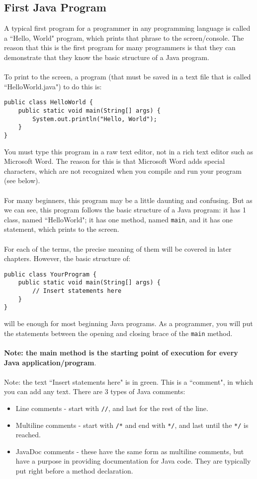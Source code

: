 \subsection{First Java Program}
A typical first program for a programmer in any programming language is called a ``Hello, World" program, which prints that phrase to the screen/console. The reason that this is the first program for many programmers is that they can demonstrate that they know the basic structure of a Java program. 
\\ \\
To print to the screen, a program (that must be saved in a text file that is called ``HelloWorld.java") to do this is:
\begin{lstlisting}
public class HelloWorld {
	public static void main(String[] args) {
		System.out.println("Hello, World");
	}
}
\end{lstlisting}
You must type this program in a raw text editor, not in a rich text editor such as Microsoft Word. The reason for this is that Microsoft Word adds special characters, which are not recognized when you compile and run your program (see below).
\\ \\
For many beginners, this program may be a little daunting and confusing. But as we can see, this program follows the basic structure of a Java program: it has 1 class, named ``HelloWorld"; it has one method, named \verb|main|, and it has one statement, which prints to the screen. 
\\ \\
For each of the terms, the precise meaning of them will be covered in later chapters. However, the basic structure of:
\begin{lstlisting}
public class YourProgram {
	public static void main(String[] args) {
		// Insert statements here
	}
}
\end{lstlisting}
will be enough for most beginning Java programs. As a programmer, you will put the statements between the opening and closing brace of the \verb|main| method.
\\ \\
\textbf{Note: the main method is the starting point of execution for every Java application/program}.
\\ \\
Note: the text ``Insert statements here" is in green. This is a ``comment", in which you can add any text. There are 3 types of Java comments:

\begin{itemize}
\item Line comments - start with \verb|//|, and last for the rest of the line.
\item Multiline comments - start with \verb|/*| and end with \verb|*/|, and last until the \verb|*/| is reached.
\item JavaDoc comments - these have the same form as multiline comments, but have a purpose in providing documentation for Java code. They are typically put right before a method declaration.
\end{itemize}

